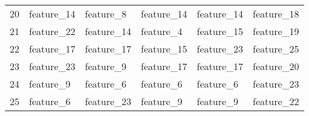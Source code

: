 \begin{tabular}{llllll}
20 &  feature\_14 &   feature\_8 &  feature\_14 &  feature\_14 &  feature\_18 \\
21 &  feature\_22 &  feature\_14 &   feature\_4 &  feature\_15 &  feature\_19 \\
22 &  feature\_17 &  feature\_17 &  feature\_15 &  feature\_23 &  feature\_25 \\
23 &  feature\_23 &   feature\_9 &  feature\_17 &  feature\_17 &  feature\_20 \\
24 &   feature\_9 &   feature\_6 &   feature\_6 &   feature\_6 &  feature\_23 \\
25 &   feature\_6 &  feature\_23 &   feature\_9 &   feature\_9 &  feature\_22 \\
\bottomrule
\end{tabular}
